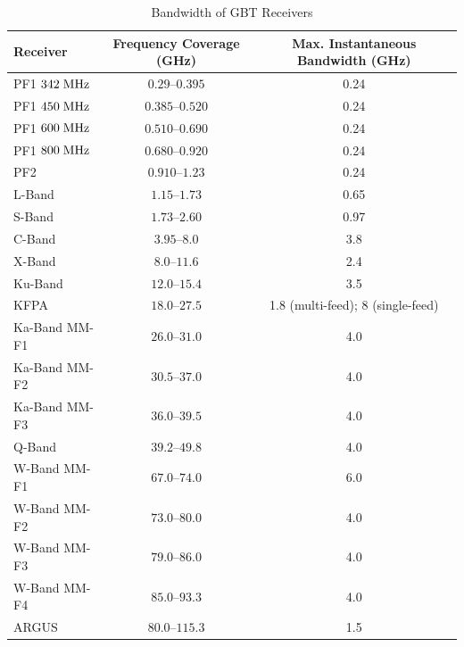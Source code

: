 \documentclass[10pt]{myNSF}
\begin{document}
\begin{table}[t]
  \centering
  \caption{Bandwidth of GBT Receivers \label{table:rx_bandwidth}}
  \begin{tabular}{|l|c|c|}
    \hline
    Receiver & Frequency Coverage (GHz) & Max. Instantaneous Bandwidth (GHz) \\
    \hline
    PF1 $342\; \textrm{MHz}$ & $0.29$--$0.395$ & 0.24 \\
    PF1 $450\; \textrm{MHz}$ & $0.385$--$0.520$ & 0.24 \\
    PF1 $600\; \textrm{MHz}$ & $0.510$--$0.690$ & 0.24 \\
    PF1 $800\; \textrm{MHz}$ & $0.680$--$0.920$ & 0.24 \\
    PF2              & $0.910$--$1.23$ & 0.24 \\
    L-Band           & $1.15$--$1.73$ & 0.65 \\    
    S-Band           & $1.73$--$2.60$ & 0.97 \\
    C-Band           & $3.95$--$8.0$ & 3.8 \\
    X-Band           & $8.0$--$11.6$ & 2.4 \\
    Ku-Band          & $12.0$--$15.4$ & 3.5 \\
    KFPA             & $18.0$--$27.5$ & 1.8 (multi-feed); 8 (single-feed) \\
    Ka-Band MM-F1    & $26.0$--$31.0$ & 4.0 \\
    Ka-Band MM-F2    & $30.5$--$37.0$ & 4.0 \\
    Ka-Band MM-F3    & $36.0$--$39.5$ & 4.0 \\
    Q-Band           & $39.2$--$49.8$ & 4.0 \\
    W-Band MM-F1     & $67.0$--$74.0$ & 6.0 \\
    W-Band MM-F2     & $73.0$--$80.0$ & 4.0 \\
    W-Band MM-F3     & $79.0$--$86.0$ & 4.0 \\
    W-Band MM-F4     & $85.0$--$93.3$ & 4.0 \\
    ARGUS            & $80.0$--$115.3$ & 1.5 \\
    \hline
  \end{tabular}
\end{table}
\end{document}
